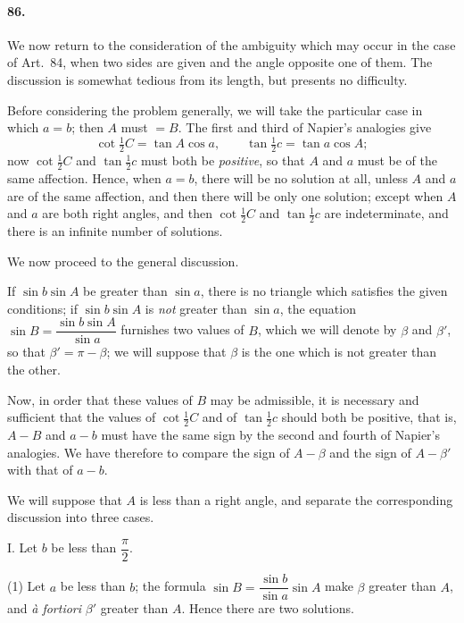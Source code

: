 \documentclass{book}[2004/02/16]
\begin{document}
\begin{mainmatter}
\begin{spacing}{1.3}
\paragraph{86.} We now return to the consideration of the ambiguity
which may occur in the case of Art.\ 84, when two sides are given
and the angle opposite one of them. The discussion is somewhat
tedious from its length, but presents no difficulty.

Before considering the problem generally, we will take the
particular case in which $a = b$; then $A$ must $= B$. The first and
third of Napier's analogies give
\[
\cot \tfrac{1}{2}C = \tan A \cos a,\qquad \tan \tfrac{1}{2}c = \tan a \cos A;
\]
now $\cot \tfrac{1}{2}C$ and $\tan \tfrac{1}{2}c$ must both be \textit{positive}, so that $A$ and $a$ must
be of the same affection. Hence, when $a = b$, there will be no
solution at all, unless $A$ and $a$ are of the same affection, and then
there will be only one solution; except when $A$ and $a$ are both
right angles, and then $\cot \tfrac{1}{2}C$ and $\tan\tfrac{1}{2}c$ are indeterminate, and
there is an infinite number of solutions.

We now proceed to the general discussion.

If $\sin b \sin A$ be greater than $\sin a$, there is no triangle which
satisfies the given conditions; if $\sin b \sin A$ is \textit{not} greater than
$\sin a$, the equation $\sin B = \dfrac{\sin b \sin A}{\sin a}$ furnishes two values of $B$,
which we will denote by $\beta$ and $\beta'$, so that $\beta' = \pi - \beta$; we will suppose
that $\beta$ is the one which is not greater than the other.

Now, in order that these values of $B$ may be admissible, it is
necessary and sufficient that the values of $\cot\frac{1}{2}C$ and of $\tan\frac{1}{2}c$
should both be positive, that is, $A-B$ and $a-b$ must have the
same sign by the second and fourth of Napier's analogies. We
have therefore to compare the sign of $A-\beta$ and the sign of $A-\beta'$
with that of $a-b$.

We will suppose that $A$ is less than a right angle, and separate
the corresponding discussion into three cases.\medskip

I\@. Let $b$ be less than $\dfrac{\pi}{2}$.

(1) Let $a$ be less than $b$; the formula $\sin B = \dfrac{\sin b}{\sin a}\sin A$ make
$\beta$ greater than $A$, and \textit{\`a fortiori} $\beta'$ greater than $A$. Hence there
are two solutions.


\end{spacing}
\end{mainmatter}
\end{document}
